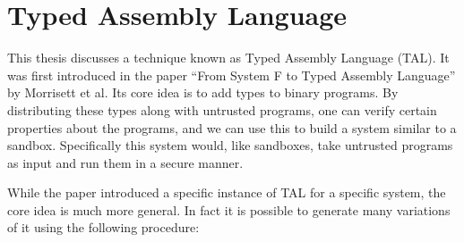 \section{Typed Assembly Language}

This thesis discusses a technique known as Typed Assembly Language (TAL). It was
first introduced in the paper ``From System F to Typed Assembly Language'' by
Morrisett et al. Its core idea is to add types to binary programs. By
distributing these types along with untrusted programs, one can verify certain
properties about the programs, and we can use this to build a system similar to
a sandbox. Specifically this system would, like sandboxes, take untrusted
programs as input and run them in a secure manner.

While the paper introduced a specific instance of TAL for a specific system, the
core idea is much more general. In fact it is possible to generate many
variations of it using the following procedure:

